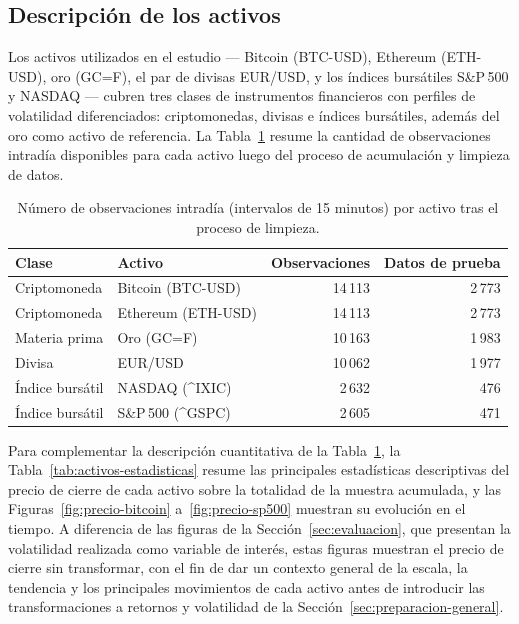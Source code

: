 \documentclass[12pt]{paper}
\begin{document}
\subsection{Descripción de los activos}
\label{sec:descripcion-activos}

Los activos utilizados en el estudio --- Bitcoin (BTC-USD), Ethereum (ETH-USD), oro (GC=F), el par de divisas EUR/USD, y los índices bursátiles S\&P\,500 y NASDAQ --- cubren tres clases de instrumentos financieros con perfiles de volatilidad diferenciados: criptomonedas, divisas e índices bursátiles, además del oro como activo de referencia. La Tabla~\ref{tab:activos} resume la cantidad de observaciones intradía disponibles para cada activo luego del proceso de acumulación y limpieza de datos.

\begin{table}[H]
    \centering
    \caption{Número de observaciones intradía (intervalos de 15 minutos) por activo tras el proceso de limpieza.}
    \label{tab:activos}
    \begin{tabular}{llrr}
        \hline
        \textbf{Clase} & \textbf{Activo} & \textbf{Observaciones} & \textbf{Datos de prueba} \\
        \hline
        Criptomoneda    & Bitcoin (BTC-USD)  & 14\,113 & 2\,773 \\
        Criptomoneda    & Ethereum (ETH-USD) & 14\,113 & 2\,773 \\
        Materia prima   & Oro (GC=F)         & 10\,163 & 1\,983 \\
        Divisa          & EUR/USD            & 10\,062 & 1\,977 \\
        Índice bursátil & NASDAQ (\^{}IXIC)  & 2\,632 & 476 \\
        Índice bursátil & S\&P\,500 (\^{}GSPC) & 2\,605 & 471 \\
        \hline
    \end{tabular}
\end{table}

Para complementar la descripción cuantitativa de la Tabla~\ref{tab:activos}, la Tabla~\ref{tab:activos-estadisticas} resume las principales estadísticas descriptivas del precio de cierre de cada activo sobre la totalidad de la muestra acumulada, y las Figuras~\ref{fig:precio-bitcoin} a~\ref{fig:precio-sp500} muestran su evolución en el tiempo. A diferencia de las figuras de la Sección~\ref{sec:evaluacion}, que presentan la volatilidad realizada como variable de interés, estas figuras muestran el precio de cierre sin transformar, con el fin de dar un contexto general de la escala, la tendencia y los principales movimientos de cada activo antes de introducir las transformaciones a retornos y volatilidad de la Sección~\ref{sec:preparacion-general}.
\end{document}
